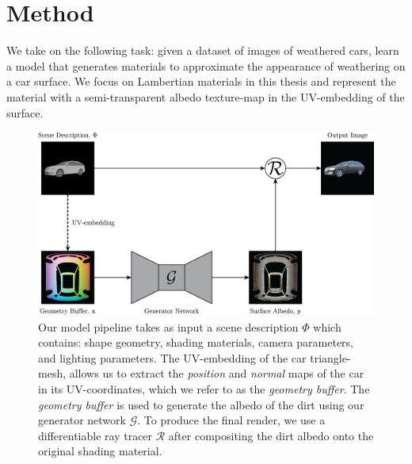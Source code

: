 \chapter{Method} \label{ch:method}

We take on the following task: given a dataset of images of weathered cars,
learn a model that generates materials to approximate the appearance of
weathering on a car surface. We focus on Lambertian materials in this thesis and represent the material with a
semi-transparent albedo texture-map in the UV-embedding of the surface.

\begin{figure}[ht]
    \centering
    \caption{Our model pipeline takes as input a scene description $\Phi$ which contains:
        shape geometry, shading materials, camera parameters, and lighting parameters.
        The UV-embedding of the car triangle-mesh, allows us to extract the \emph{position}
        and \emph{normal} maps of the car in its UV-coordinates, which we refer to as the
        \emph{geometry buffer}. The \emph{geometry buffer} is used to generate the albedo
        of the dirt using our generator network $\mathcal{G}$. To produce the final render,
        we use a differentiable ray tracer $\mathcal{R}$ after compositing the dirt albedo
        onto the original shading material.}
    \label{fig:generator-pipeline}
    \vspace{0.2in}
    \includegraphics[width=.9\linewidth]{graphics/pipeline.png}
\end{figure}
